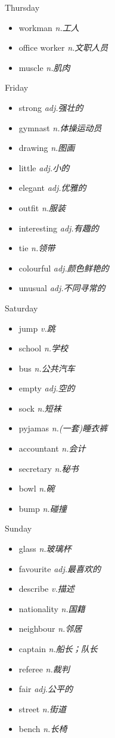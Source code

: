 \documentclass{ctexart}
\begin{document}
\begin{multicols}{2}
\begin{textbox}{Thursday}
\begin{itemize}
\item workman \emph{n.工人}
\item office worker \emph{n.文职人员}
\item muscle \emph{n.肌肉}
\end{itemize}
\end{textbox}
\begin{textbox}{Friday}
\begin{itemize}
\item strong \emph{adj.强壮的}
\item gymnast \emph{n.体操运动员}
\item drawing \emph{n.图画}
\item little \emph{adj.小的}
\item elegant \emph{adj.优雅的}
\item outfit \emph{n.服装}
\item interesting \emph{adj.有趣的}
\item tie \emph{n.领带}
\item colourful \emph{adj.颜色鲜艳的}
\item unusual \emph{adj.不同寻常的}
\end{itemize}
\end{textbox}
\begin{textbox}{Saturday}
\begin{itemize}
\item jump \emph{v.跳}
\item school \emph{n.学校}
\item bus \emph{n.公共汽车}
\item empty \emph{adj.空的}
\item sock \emph{n.短袜}
\item pyjamas \emph{n.(一套)睡衣裤}
\item accountant \emph{n.会计}
\item secretary \emph{n.秘书}
\item bowl \emph{n.碗}
\item bump \emph{n.碰撞}
\end{itemize}
\end{textbox}
\begin{textbox}{Sunday}
\begin{itemize}
\item glass \emph{n.玻璃杯}
\item favourite \emph{adj.最喜欢的}
\item describe \emph{v.描述}
\item nationality \emph{n.国籍}
\item neighbour \emph{n.邻居}
\item captain \emph{n.船长；队长}
\item referee \emph{n.裁判}
\item fair \emph{adj.公平的}
\item street \emph{n.街道}
\item bench \emph{n.长椅}
\end{itemize}
\end{textbox}
\end{multicols}
\end{document}
